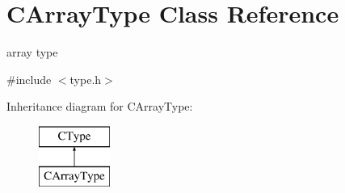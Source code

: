 \hypertarget{classCArrayType}{\section{C\-Array\-Type Class Reference}
\label{classCArrayType}
}


array type  




{\ttfamily \#include $<$type.\-h$>$}

Inheritance diagram for C\-Array\-Type\-:\begin{figure}[H]
\begin{center}
\leavevmode
\includegraphics[height=2.000000cm]{classCArrayType}
\end{center}
\end{figure}
